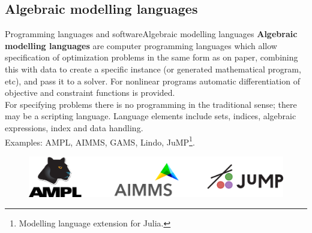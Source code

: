\documentclass[handout]{beamer}
\begin{document}
\subsection{Algebraic modelling languages}
\begin{frame}[t]{Programming languages and software}{Algebraic modelling languages}
\textbf{Algebraic modelling languages} are computer programming languages which allow specification of optimization problems in the same form as on paper, combining this with data to create a specific instance (or generated mathematical program, etc), and pass it to a solver. For nonlinear programs automatic differentiation of objective and constraint functions is provided.\\[6pt]

For specifying problems there is no programming in the traditional sense; there may be a scripting language. Language elements include sets, indices, algebraic expressions, index and data handling.\\[6pt]

Examples: AMPL, AIMMS, GAMS, Lindo, JuMP\footnote[frame]{Modelling language extension for Julia.}.

\begin{figure}
\begin{center}
\includegraphics[width=.40\textwidth]{AML.png}
\end{center}
\end{figure}


\end{frame}

\end{document}
